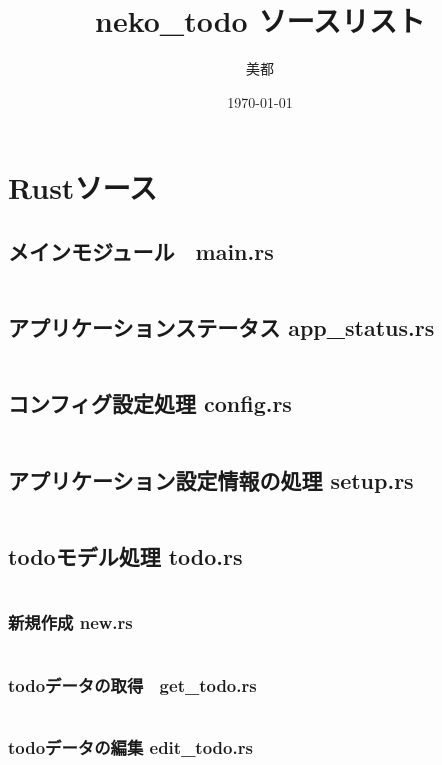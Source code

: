 \documentclass[paper=a4paper, fontsize=10pt, head_space=10mm, foot_space=17mm, gutter=17mm, line_length=185mm, twoside]{jlreq}
\title{neko\_todo ソースリスト}
\author{美都}
\date{\today}
\begin{document}
\maketitle
\tableofcontents
\clearpage

\section{Rustソース}
\subsection{メインモジュール　main.rs}
\inputminted[linenos, breaklines]{rust}{src-rs/main.rs}
\clearpage
\subsection{アプリケーションステータス app\_status.rs}
\inputminted[linenos, breaklines]{rust}{src-rs/app_status.rs}
\clearpage

\subsection{コンフィグ設定処理 config.rs}
\inputminted[linenos, breaklines]{rust}{src-rs/config.rs}
\clearpage

\subsection{アプリケーション設定情報の処理 setup.rs}
\inputminted[linenos, breaklines]{rust}{src-rs/setup.rs}
\clearpage

\subsection{todoモデル処理 todo.rs}
\inputminted[linenos, breaklines]{rust}{src-rs/todo.rs}
\clearpage

\subsubsection{新規作成 new.rs}
\inputminted[linenos, breaklines]{rust}{src-rs/todo/new.rs}
\clearpage

\subsubsection{todoデータの取得　get\_todo.rs}
\inputminted[linenos, breaklines]{rust}{src-rs/todo/get_todo.rs}
\clearpage

\subsubsection{todoデータの編集 edit\_todo.rs}
\inputminted[linenos, breaklines]{rust}{src-rs/todo/edit_todo.rs}
\clearpage
\end{document}
